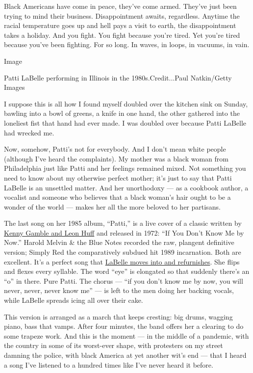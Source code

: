 Black Americans have come in peace, they've come armed. They've just
been trying to mind their business. Disappointment awaits, regardless.
Anytime the racial temperature goes up and hell pays a visit to earth,
the disappointment takes a holiday. And you fight. You fight because
you're tired. Yet you're tired because you've been fighting. For so
long. In waves, in loops, in vacuums, in vain.

Image

Patti LaBelle performing in Illinois in the 1980s.Credit...Paul
Natkin/Getty Images

I suppose this is all how I found myself doubled over the kitchen sink
on Sunday, bawling into a bowl of greens, a knife in one hand, the other
gathered into the loneliest fist that hand had ever made. I was doubled
over because Patti LaBelle had wrecked me.

Now, somehow, Patti's not for everybody. And I don't mean white people
(although I've heard the complaints). My mother was a black woman from
Philadelphia just like Patti and her feelings remained mixed. Not
something you need to know about my otherwise perfect mother; it's just
to say that Patti LaBelle is an unsettled matter. And her unorthodoxy
--- as a cookbook author, a vocalist and someone who believes that a
black woman's hair ought to be a wonder of the world --- makes her all
the more beloved to her partisans.

The last song on her 1985 album, ``Patti,'' is a live cover of a classic
written by \href{https://www.youtube.com/watch?v=PiOgnUe-T6A}{Kenny
Gamble and Leon Huff} and released in 1972: ``If You Don't Know Me by
Now.'' Harold Melvin \& the Blue Notes recorded the raw, plangent
definitive version; Simply Red the comparatively subdued hit 1989
incarnation. Both are excellent. It's a perfect song that
\href{https://www.youtube.com/watch?v=Tain2OF3Zyg}{LaBelle moves into
and refurnishes}. She flips and flexes every syllable. The word ``eye''
is elongated so that suddenly there's an ``o'' in there. Pure Patti. The
chorus --- ``if you don't know me by now, you will never, never, never
know me'' --- is left to the men doing her backing vocals, while LaBelle
spreads icing all over their cake.

This version is arranged as a march that keeps cresting: big drums,
wagging piano, bass that vamps. After four minutes, the band offers her
a clearing to do some trapeze work. And this is the moment --- in the
middle of a pandemic, with the country in some of its worst-ever shape,
with protesters on my street damning the police, with black America at
yet another wit's end --- that I heard a song I've listened to a hundred
times like I've never heard it before.

